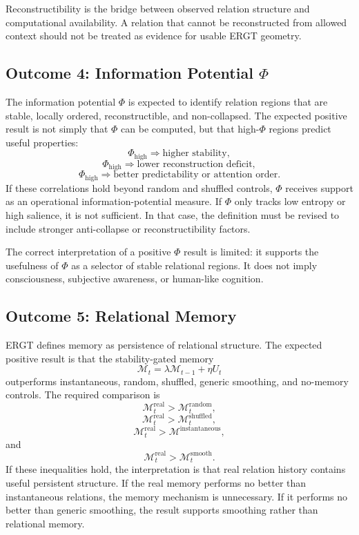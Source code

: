 \documentclass[11pt]{article}
\begin{document}
\begin{ergtclaim}
Reconstructibility is the bridge between observed relation structure and computational availability. A relation that cannot be reconstructed from allowed context should not be treated as evidence for usable ERGT geometry.
\end{ergtclaim}

\subsection{Outcome 4: Information Potential $\Phi$}

The information potential $\Phi$ is expected to identify relation regions that are stable, locally ordered, reconstructible, and non-collapsed. The expected positive result is not simply that $\Phi$ can be computed, but that high-$\Phi$ regions predict useful properties:
\[
\Phi_{\mathrm{high}}
\Rightarrow
\text{higher stability},
\]
\[
\Phi_{\mathrm{high}}
\Rightarrow
\text{lower reconstruction deficit},
\]
\[
\Phi_{\mathrm{high}}
\Rightarrow
\text{better predictability or attention order}.
\]
If these correlations hold beyond random and shuffled controls, $\Phi$ receives support as an operational information-potential measure. If $\Phi$ only tracks low entropy or high salience, it is not sufficient. In that case, the definition must be revised to include stronger anti-collapse or reconstructibility factors.

The correct interpretation of a positive $\Phi$ result is limited: it supports the usefulness of $\Phi$ as a selector of stable relational regions. It does not imply consciousness, subjective awareness, or human-like cognition.

\subsection{Outcome 5: Relational Memory}

ERGT defines memory as persistence of relational structure. The expected positive result is that the stability-gated memory
\[
\mathcal{M}_t
=
\lambda\mathcal{M}_{t-1}
+
\eta U_t
\]
outperforms instantaneous, random, shuffled, generic smoothing, and no-memory controls. The required comparison is
\[
\mathcal{M}^{\mathrm{real}}_t
>
\mathcal{M}^{\mathrm{random}}_t,
\]
\[
\mathcal{M}^{\mathrm{real}}_t
>
\mathcal{M}^{\mathrm{shuffled}}_t,
\]
\[
\mathcal{M}^{\mathrm{real}}_t
>
\mathcal{M}^{\mathrm{instantaneous}},
\]
and
\[
\mathcal{M}^{\mathrm{real}}_t
>
\mathcal{M}^{\mathrm{smooth}}_t.
\]
If these inequalities hold, the interpretation is that real relation history contains useful persistent structure. If the real memory performs no better than instantaneous relations, the memory mechanism is unnecessary. If it performs no better than generic smoothing, the result supports smoothing rather than relational memory.
\end{document}
